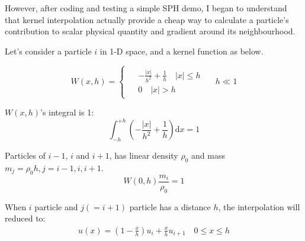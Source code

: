 However, after coding and testing a simple SPH demo, 
I began to understand that kernel interpolation actually provide a cheap way to calculate a 
particle's contribution to scalar physical quantity and gradient around its neighbourhood.

Let's consider a particle $i$ in 1-D space, and a kernel function as below.

\begin{figure}[H]
    \centering
\end{figure}

\begin{equation}
    W(x,h)=
    \begin{cases}
        \begin{aligned}
            &-\frac{|x|}{h^2}+\frac{1}{h}\quad |x| \leq h \\
            &0 \quad |x| > h
        \end{aligned}
    \end{cases}
    \quad h \ll 1
\end{equation}

$W(x,h)$'s integral is 1:
\begin{equation}
    \int_{-h}^{+h} \left(-\frac{|x|}{h^2}+\frac{1}{h}\right)\mathrm{d}x = 1
\end{equation}

Particles of $i-1$, $i$ and $i+1$, has linear density $\rho_0$ and mass 
$m_j = \rho_0 h, j=i-1,i,i+1$.
\begin{equation}
    W(0,h)\frac{m_i}{\rho_0} = 1
\end{equation}

When $i$ particle and $j(=i+1)$ particle has a distance $h$, 
the interpolation will reduced to:
\begin{equation}
    \begin{aligned}
        u(x) = \left(1-\frac{x}{h}\right)u_i + \frac{x}{h}u_{i+1}\quad 
        0\leq x \leq h
    \end{aligned}
\end{equation}

